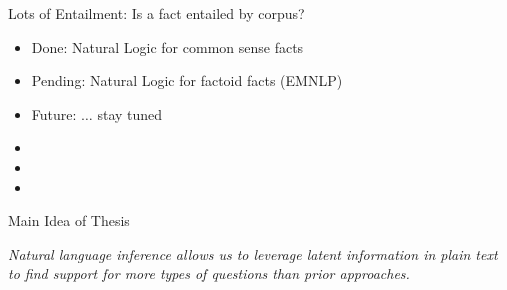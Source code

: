 \begin{frame}{Lots of Entailment: Is a fact entailed by corpus?}
\vspace{2em}

\pause
\begin{itemize}
  \item Done: Natural Logic for common sense facts
  \item Pending: Natural Logic for factoid facts (EMNLP)
  \item Future: $\dots$ stay tuned
\end{itemize}
\vspace{2em}
\pause

\begin{itemize}
  \item {}
  \item {}
  \item {}
\end{itemize}
\end{frame}

\begin{frame}{Main Idea of Thesis}
\begin{center}
\textit{
  Natural language inference allows us to leverage latent information 
  in plain text to find support for more types of questions than prior
  approaches.
}
\end{center}
\end{frame}
